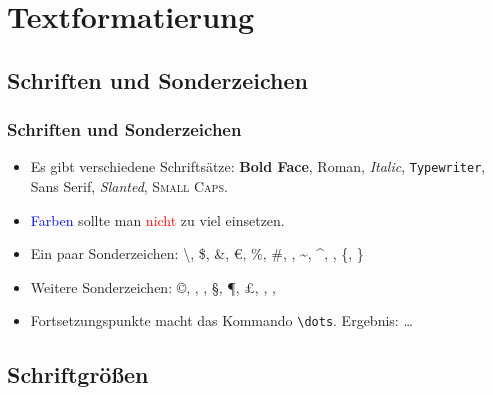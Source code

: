 \section{Textformatierung}

\subsection{Schriften und Sonderzeichen}


\begin{frame}[fragile]
	\frametitle{Schriften und Sonderzeichen}
	\begin{itemize}
		\item Es gibt verschiedene Schriftsätze: \textbf{Bold Face}, \textrm{Roman}, \textit{Italic}, \texttt{Typewriter}, \textsf{Sans Serif}, \textsl{Slanted}, \textsc{Small Caps}.
		\item \textcolor{blue}{Farben} sollte man \textcolor{red}{nicht} zu viel einsetzen.
		\item Ein paar Sonderzeichen: \textbackslash, \$, \&, \euro, \%, \#, \textunderscore, \textasciitilde, \textasciicircum, \textbar, \{, \}
		\item Weitere Sonderzeichen: \copyright, \textregistered, \texttrademark, \S, \P, \pounds, \dag, \ddag, \textbullet
		\item Fortsetzungspunkte macht das Kommando \verb!\dots!. Ergebnis: \dots
	\end{itemize}
\end{frame}

\subsection{Schriftgrößen}


